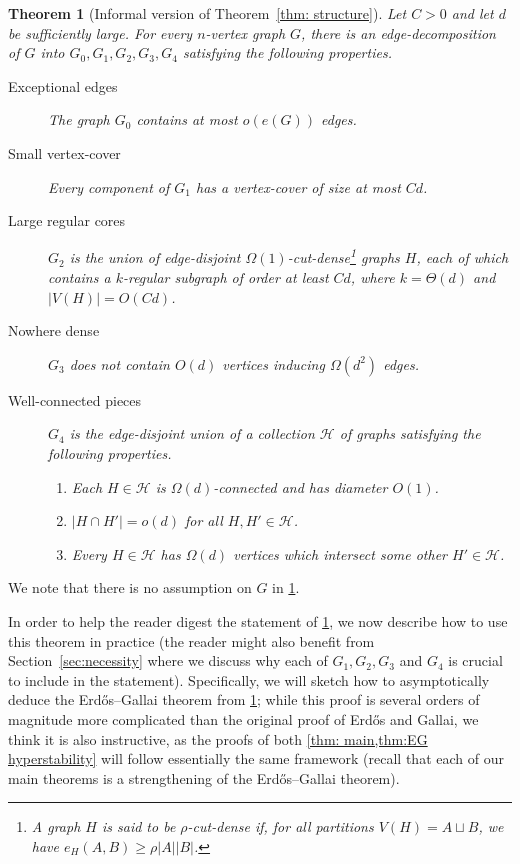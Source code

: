 \documentclass[10pt]{article}
\newtheorem{theorem}{Theorem}[section]
\theoremstyle{definition}
\newcommand\ab[1]{\lvert#1\rvert}
\let\geq\geqslant
\begin{document}
\begin{theorem}[Informal version of Theorem~\ref{thm: structure}]\label{thm: structure informal}
    Let $C>0$ and let $d$ be sufficiently large. For every $n$-vertex graph $G$,
    there is an edge-decomposition of $G$ into $G_0,G_1,G_2,G_3,G_4$ satisfying the following properties.
    \begin{description}
        \item[Exceptional edges] The graph $G_0$ contains at most $o(e(G))$ edges.
        \item[Small vertex-cover] Every component of $G_1$ has a vertex-cover of size at most $Cd$.
        \item[Large regular cores] $G_2$ is the union of edge-disjoint $\Omega(1)$-cut-dense\footnote{A graph $H$ is said to be $\rho$-cut-dense if, for all partitions $V(H)=A\sqcup B$, we have $e_H(A,B)\geq \rho\ab A \ab B$.} graphs $H$, each of which contains a $k$-regular subgraph of order at least $Cd$, where $k=\Theta(d)$ and $\ab{V(H)}= O(Cd)$.  
        \item[Nowhere dense] $G_3$ does not contain $O(d)$ vertices inducing $\Omega(d^2)$ edges. 
        \item[Well-connected pieces] $G_4$ is the edge-disjoint union of a collection $\mathcal H$ of graphs satisfying the following properties.
        \begin{enumerate}
            \item Each $H\in\mathcal H$ is $\Omega(d)$-connected and has diameter $O(1)$.
            \item $|H\cap H'|=o(d)$ for all $H,H' \in \mathcal H$.
            \item Every $H\in \mathcal H$ has $\Omega(d)$ vertices which intersect some other $H'\in\mathcal H$.
        \end{enumerate}
        
    \end{description}
\end{theorem}
\noindent We note that there is no assumption on $G$ in \cref{thm: structure informal}.

In order to help the reader digest the statement of \cref{thm: structure informal}, we now describe how to use this theorem in practice (the reader might also benefit from Section~\ref{sec:necessity} where we discuss why each of $G_1,G_2,G_3$ and $G_4$ is crucial to include in the statement). Specifically, we will sketch how to asymptotically deduce the Erd\H os--Gallai theorem from \cref{thm: structure informal}; while this proof is several orders of magnitude more complicated than the original proof of Erd\H os and Gallai, we think it is also instructive, as the proofs of both \cref{thm: main,thm:EG hyperstability} will follow essentially the same framework (recall that each of our main theorems is a strengthening of the Erd\H os--Gallai theorem). 
\end{document}
